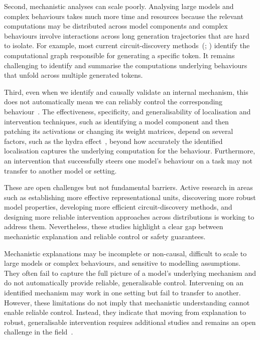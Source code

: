 Second, mechanistic analyses can scale poorly. Analysing large models and complex behaviours takes much more time and resources because the relevant computations may be distributed across model components and complex behaviours involve interactions across long generation trajectories that are hard to isolate. For example, most current circuit-discovery methods~(; ) identify the computational graph responsible for generating a specific token. It remains challenging to identify and summarise the computations underlying behaviours that unfold across multiple generated tokens.

Third, even when we identify and causally validate an internal mechanism, this does not automatically mean we can reliably control the corresponding behaviour~. The effectiveness, specificity, and generalisability of localisation and intervention techniques, such as identifying a model component and then patching its activations or changing its weight matrices, depend on several factors, such as the hydra effect~, beyond how accurately the identified localisation captures the underlying computation for the behaviour. Furthermore, an intervention that successfully steers one model's behaviour on a task may not transfer to another model or setting.

These are open challenges but not fundamental barriers. Active research in areas such as establishing more effective representational units, discovering more robust model properties, developing more efficient circuit-discovery methods, and designing more reliable intervention approaches across distributions is working to address them. Nevertheless, these studies highlight a clear gap between mechanistic explanation and reliable control or safety guarantees.

\begin{warningbox}
Mechanistic explanations may be incomplete or non-causal, difficult to scale to large models or complex behaviours, and sensitive to modelling assumptions. They often fail to capture the full picture of a model's underlying mechanism and do not automatically provide reliable, generalisable control. Intervening on an identified mechanism may work in one setting but fail to transfer to another. However, these limitations do not imply that mechanistic understanding cannot enable reliable control. Instead, they indicate that moving from explanation to robust, generalisable intervention requires additional studies and remains an open challenge in the field~.
\end{warningbox}

